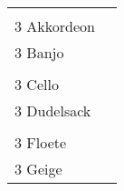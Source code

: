 \documentclass{article}\usepackage[ngerman]{babel}\usepackage{geometry}\usepackage{lmodern}
\begin{document}
\begin{table}[p]
  \begin{tabular}{ll}    \hspace{-2em}    \fbox{\begin{minipage}[t][6cm][t]{8cm}
        \fontsize{45}{54} \selectfont
        \phantom{ }\\
      \phantom{ }3 Akkordeon    \end{minipage}}
    &
\fbox{\begin{minipage}[t][6cm][t]{8cm}
        \fontsize{45}{54} \selectfont
        \phantom{ }\\
        \phantom{ } 3 Banjo      \end{minipage}}\\    \hspace{-2em}    \fbox{\begin{minipage}[t][6cm][t]{8cm}
        \fontsize{45}{54} \selectfont
        \phantom{ }\\
      \phantom{ }3 Cello    \end{minipage}}
    &
\fbox{\begin{minipage}[t][6cm][t]{8cm}
        \fontsize{45}{54} \selectfont
        \phantom{ }\\
        \phantom{ } 3 Dudelsack      \end{minipage}}\\    \hspace{-2em}    \fbox{\begin{minipage}[t][6cm][t]{8cm}
        \fontsize{45}{54} \selectfont
        \phantom{ }\\
      \phantom{ }3 Floete    \end{minipage}}
    &
\fbox{\begin{minipage}[t][6cm][t]{8cm}
        \fontsize{45}{54} \selectfont
        \phantom{ }\\
        \phantom{ } 3 Geige      \end{minipage}}\\\end{tabular}
\end{table}
\end{document}
